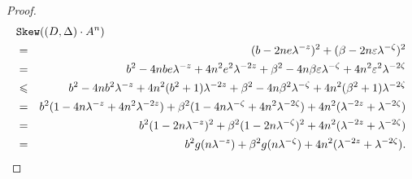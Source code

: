 \begin{proof}
\begin{eqnarray}
\lefteqn{\sk(\state\cdot A^{n})}\nonumber \\
& = & (b-2ne{\lambda^{-z}})^2+(\beta-2n\varepsilon{\lambda^{-\zeta}})^2 
  \nonumber\\
& = & b^2
-4nbe{\lambda^{-z}}
+4n^2e^2{\lambda^{-2z}}
+\beta^2
-4n\beta\varepsilon{\lambda^{-\zeta}}
+4n^2\varepsilon^2{\lambda^{-2\zeta}}
  \nonumber\\
& \leq & b^2
-4nb^2{\lambda^{-z}}
+4n^2(b^2+1){\lambda^{-2z}}
+\beta^2
-4n\beta^2{\lambda^{-\zeta}}
+4n^2(\beta^2+1){\lambda^{-2\zeta}}
  \nonumber\\
& = & 
b^2(
1
-4n{\lambda^{-z}}
+4n^2{\lambda^{-2z}}
)+\beta^2(
1
-4n{\lambda^{-\zeta}}
+4n^2{\lambda^{-2\zeta}}
)+4n^2({\lambda^{-2z}}+{\lambda^{-2\zeta}})
  \nonumber \\
& = & 
b^2(1-2n\lambda^{-z})^2
+\beta^2(1-2n\lambda^{-\zeta})^2
+4n^2({\lambda^{-2z}}+{\lambda^{-2\zeta}})
  \nonumber \\
& = & b^2g(n{\lambda^{-z}})+\beta^2g(n{\lambda^{-\zeta}})+ 
  4n^2({\lambda^{-2z}}+{\lambda^{-2\zeta}}).\nonumber
\end{eqnarray}


\end{proof}
